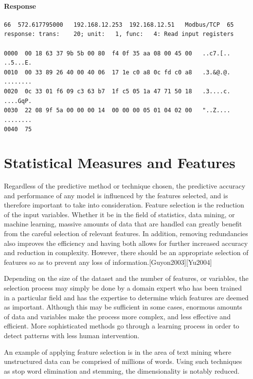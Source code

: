 \documentclass[12pt,]{article}
\begin{document}
\paragraph{Response}\label{response}

\begin{verbatim}
66  572.617795000   192.168.12.253  192.168.12.51   Modbus/TCP  65
response: trans:    20; unit:   1, func:   4: Read input registers

0000  00 18 63 37 9b 5b 00 80  f4 0f 35 aa 08 00 45 00   ..c7.[.. ..5...E.
0010  00 33 89 26 40 00 40 06  17 1e c0 a8 0c fd c0 a8   .3.&@.@. ........
0020  0c 33 01 f6 09 c3 63 b7  1f c5 05 1a 47 71 50 18   .3....c. ....GqP.
0030  22 08 9f 5a 00 00 00 14  00 00 00 05 01 04 02 00   "..Z.... ........
0040  75
\end{verbatim}

\pagebreak

\section{Statistical Measures and
Features}\label{statistical-measures-and-features}

Regardless of the predictive method or technique chosen, the predictive
accuracy and performance of any model is influenced by the features
selected, and is therefore important to take into consideration. Feature
selection is the reduction of the input variables. Whether it be in the
field of statistics, data mining, or machine learning, massive amounts
of data that are handled can greatly benefit from the careful selection
of relevant features. In addition, removing redundancies also improves
the efficiency and having both allows for further increased accuracy and
reduction in complexity. However, there should be an appropriate
selection of features so as to prevent any loss of
information.{[}Guyon2003{]}{[}Yu2004{]}

Depending on the size of the dataset and the number of features, or
variables, the selection process may simply be done by a domain expert
who has been trained in a particular field and has the expertise to
determine which features are deemed as important. Although this may be
sufficient in some cases, enormous amounts of data and variables make
the process more complex, and less effective and efficient. More
sophisticated methods go through a learning process in order to detect
patterns with less human intervention.

An example of applying feature selection is in the area of text mining
where unstructured data can be comprised of millions of words. Using
such techniques as stop word elimination and stemming, the
dimensionality is notably reduced.
\end{document}
